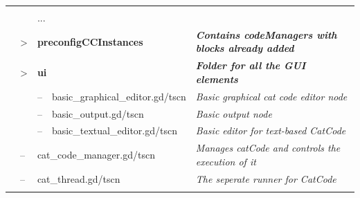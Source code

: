 \begin{fullwidth}
\centering
\begin{tabular}{|rllllp{11cm}|}\hline
    & & \multicolumn{3}{l}{} &
    \\
    & & \multicolumn{3}{l}{...} &
    \\
    & > & \multicolumn{3}{l}{
        \textbf{preconfigCCInstances} 
    }
    & \textit{\textbf{Contains codeManagers with blocks already added}}
    \\
    & > & \multicolumn{3}{l}{
        \textbf{ui} 
    }
    & \textit{\textbf{Folder for all the GUI elements}}
    \\
    & & -- & \multicolumn{2}{l}{
        basic\_graphical\_editor.gd/tscn
    }
    & \textit{Basic graphical cat code editor node}
    \\
    & & -- & \multicolumn{2}{l}{
        basic\_output.gd/tscn
    }
    & \textit{Basic output node}
    \\
    & & -- & \multicolumn{2}{l}{
        basic\_textual\_editor.gd/tscn
    }
    & \textit{Basic editor for text-based CatCode}
    \\
    & -- & \multicolumn{3}{l}{
        cat\_code\_manager.gd/tscn
    }
    & \textit{Manages catCode and controls the execution of it}
    \\
    & -- & \multicolumn{3}{l}{
        cat\_thread.gd/tscn
    }
    & \textit{The seperate runner for CatCode}
    \\
    & & \multicolumn{3}{l}{} &
    \\
\hline
\end{tabular}
\end{fullwidth}